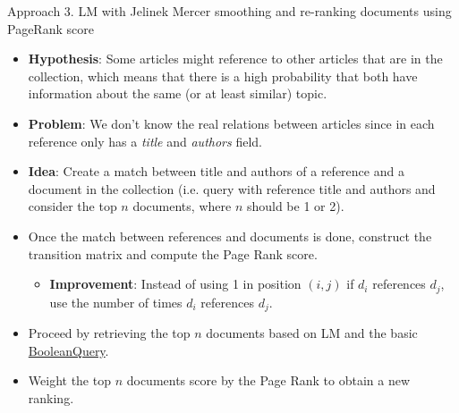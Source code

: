 \documentclass[10pt]{beamer}
\begin{document}
{\begin{frame}{Approach 3. LM with Jelinek Mercer smoothing and re-ranking documents using PageRank score}
    \begin{itemize}
        \item \textbf{Hypothesis}: Some articles might reference to other articles that are in the collection, which means that there is a high probability that both have information about the same (or at least similar) topic. 
        \item \textbf{Problem}: We don't know the real relations between articles since in each reference only has a \textit{title} and \textit{authors} field.
        \item \textbf{Idea}: Create a match between title and authors of a reference and a document in the collection (i.e. query with reference title and authors and consider the top $n$ documents, where $n$ should be 1 or 2).
        \item Once the match between references and documents is done, construct the transition matrix and compute the Page Rank score.
        \begin{itemize}
            \item \textbf{Improvement}: Instead of using 1 in position $(i, j)$ if $d_i$ references $d_j$, use the number of times $d_i$ references $d_j$.
        \end{itemize}
        \item Proceed by retrieving the top $n$ documents based on LM and the basic \href{https://lucene.apache.org/core/8_9_0/core/org/apache/lucene/search/BooleanQuery.html}{BooleanQuery}.
        \item Weight the top $n$ documents score by the Page Rank to obtain a new ranking.
    \end{itemize}
\end{frame}


}
\end{document}
